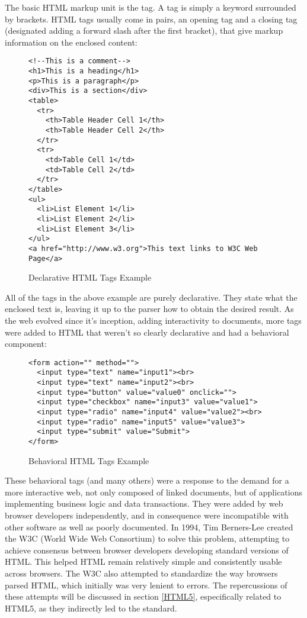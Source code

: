 The basic HTML markup unit is the tag. A tag is simply a keyword surrounded by brackets. HTML tags usually come in pairs, an opening tag and a closing tag (designated adding a forward slash after the first bracket), that give markup information on the enclosed content:
\begin{figure}[ht]
\begin{verbatim}
<!--This is a comment-->
<h1>This is a heading</h1>
<p>This is a paragraph</p>
<div>This is a section</div>
<table>
  <tr>
    <th>Table Header Cell 1</th>
    <th>Table Header Cell 2</th> 
  </tr>
  <tr>
    <td>Table Cell 1</td>
    <td>Table Cell 2</td> 
  </tr>
</table>
<ul>
  <li>List Element 1</li>
  <li>List Element 2</li>
  <li>List Element 3</li>
</ul>
<a href="http://www.w3.org">This text links to W3C Web Page</a>
\end{verbatim}
\caption{Declarative HTML Tags Example}
\end{figure}
All of the tags in the above example are purely declarative. They state what the enclosed text is, leaving it up to the parser how to obtain the desired result. As the web evolved since it's inception, adding interactivity to documents, more tags were added to HTML that weren't so clearly declarative and had a behavioral component:
\begin{figure}[ht]
\begin{verbatim}
<form action="" method="">
  <input type="text" name="input1"><br>
  <input type="text" name="input2"><br>
  <input type="button" value="value0" onclick="">
  <input type="checkbox" name="input3" value="value1">
  <input type="radio" name="input4" value="value2"><br>
  <input type="radio" name="input5" value="value3">
  <input type="submit" value="Submit">
</form>
\end{verbatim}
\caption{Behavioral HTML Tags Example}
\end{figure}
These behavioral tags (and many others) were a response to the demand for a more interactive web, not only composed of linked documents, but of applications implementing business logic and data transactions. They were added by web browser developers independently, and in consequence were incompatible with other software as well as poorly documented. In 1994, Tim Berners-Lee created the W3C (World Wide Web Consortium) to solve this problem, attempting to achieve consensus between browser developers developing standard versions of HTML. This helped HTML remain relatively simple and consistently usable across browsers. The W3C also attempted to standardize the way browsers parsed HTML, which initially was very lenient to errors. The repercussions of these attempts will be discussed in section \ref{HTML5}, especifically related to HTML5, as they indirectly led to the standard.\\

